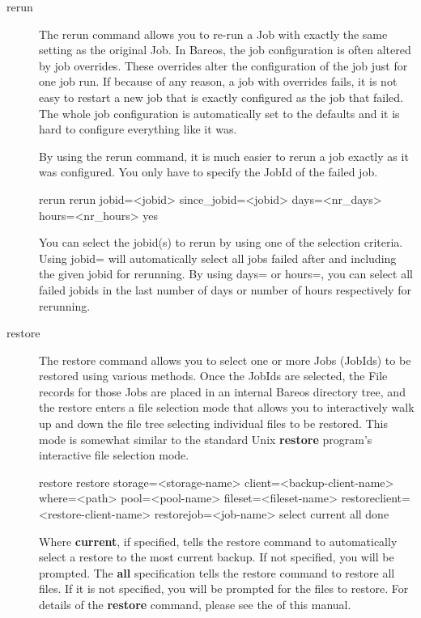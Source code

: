 \begin{description}
\item [rerun]
   The rerun command allows you to re-run a Job with exactly the same setting
   as the original Job. In Bareos, the job configuration is often altered by job
   overrides. These overrides alter the configuration of the job just for one job run.
   If because of any reason, a job with overrides fails, it is not easy to restart
   a new job that is exactly configured as the job that failed. The whole job
   configuration is automatically set to the defaults and it is hard to
   configure everything like it was.

   By using the rerun command, it is much easier to rerun a job exactly
   as it was configured. You only have to specify the JobId of the failed job.

\begin{bconsole}{rerun}
rerun jobid=<jobid> since_jobid=<jobid> days=<nr_days> hours=<nr_hours> yes
\end{bconsole}

   You can select the jobid(s) to rerun by using one of the selection criteria. Using jobid= will automatically select all jobs failed after and including the given jobid for rerunning. By using days= or hours=, you can select all failed jobids in the last number of days or number of hours respectively for rerunning.

\item [restore]
   \label{bcommandRestore}
   The restore command allows you to select one or more Jobs (JobIds) to be
   restored using various methods.  Once the JobIds are selected, the File
   records for those Jobs are placed in an internal Bareos directory tree,
   and the restore enters a file selection mode that allows you to
   interactively walk up and down the file tree selecting individual files
   to be restored.  This mode is somewhat similar to the standard Unix {\bf
   restore} program's interactive file selection mode.

\begin{bconsole}{restore}
restore storage=<storage-name> client=<backup-client-name>
  where=<path> pool=<pool-name> fileset=<fileset-name>
  restoreclient=<restore-client-name>
  restorejob=<job-name>
  select current all done
\end{bconsole}

   Where {\bf current}, if specified, tells the restore command to
   automatically select a restore to the most current backup.  If not
   specified, you will be prompted.  The {\bf all} specification tells the
   restore command to restore all files.  If it is not specified, you will
   be prompted for the files to restore.  For details of the {\bf restore}
   command, please see the  of this
   manual.


\end{description}
